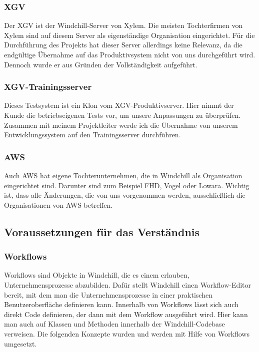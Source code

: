 \subsubsection{\acs{XGV}}
Der \acl{XGV} ist der Windchill-Server von Xylem.
Die meisten Tochterfirmen von Xylem sind auf diesem Server als eigenständige Organisation eingerichtet.
Für die Durchführung des Projekts hat dieser Server allerdings keine Relevanz, da die endgültige Übernahme auf das Produktivsystem nicht von uns durchgeführt wird.
Dennoch wurde er aus Gründen der Vollständigkeit aufgeführt.

\subsubsection{\ac{XGV}-Trainingsserver}
Dieses Testsystem ist ein Klon vom \ac{XGV}-Produktivserver.
Hier nimmt der Kunde die betriebseigenen Tests vor, um unsere Anpassungen zu überprüfen.
Zusammen mit meinem Projektleiter werde ich die Übernahme von unserem Entwicklungssystem auf den Trainingsserver durchführen.

\subsubsection{\acs{AWS}}
Auch \ac{AWS} hat eigene Tochterunternehmen, die in Windchill als Organisation eingerichtet sind.
Darunter sind zum Beispiel FHD, Vogel oder Lowara.
Wichtig ist, dass alle Änderungen, die von uns vorgenommen werden, ausschließlich die Organisationen von \ac{AWS} betreffen.

\subsection{Voraussetzungen für das Verständnis}
\label{subsec:VerstaendnisVoraussetzungen}

\subsubsection{Workflows}
Workflows sind Objekte in Windchill, die es einem erlauben, Unternehmensprozesse abzubilden.
Dafür stellt Windchill einen Workflow-Editor bereit, mit dem man die Unternehmensprozesse in einer praktischen Benutzeroberfläche definieren kann.
Innerhalb von Workflows lässt sich auch direkt Code definieren, der dann mit dem Workflow ausgeführt wird.
Hier kann man auch auf Klassen und Methoden innerhalb der Windchill-Codebase verweisen.
Die folgenden Konzepte wurden und werden mit Hilfe von Workflows umgesetzt.

